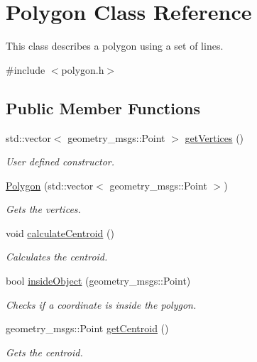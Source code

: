 \hypertarget{class_polygon}{}\section{Polygon Class Reference}
\label{class_polygon}


This class describes a polygon using a set of lines.  




{\ttfamily \#include $<$polygon.\+h$>$}

\subsection*{Public Member Functions}
\begin{DoxyCompactItemize}
\item 
std\+::vector$<$ geometry\+\_\+msgs\+::\+Point $>$ \hyperlink{class_polygon_ac64090fe1e43e46d7667ffc9021878cd}{get\+Vertices} ()
\begin{DoxyCompactList}\small\item\em User defined constructor. \end{DoxyCompactList}\item 
\hyperlink{class_polygon_a31cc06303d544f460bdc89f61b2d03c2}{Polygon} (std\+::vector$<$ geometry\+\_\+msgs\+::\+Point $>$)
\begin{DoxyCompactList}\small\item\em Gets the vertices. \end{DoxyCompactList}\item 
\mbox{\label{class_polygon_a3232e5ee78e5a4dd771217cab87b0fa4}} 
void \hyperlink{class_polygon_a3232e5ee78e5a4dd771217cab87b0fa4}{calculate\+Centroid} ()
\begin{DoxyCompactList}\small\item\em Calculates the centroid. \end{DoxyCompactList}\item 
bool \hyperlink{class_polygon_a44c9c10e84f1fa82da3f9353b8961462}{inside\+Object} (geometry\+\_\+msgs\+::\+Point)
\begin{DoxyCompactList}\small\item\em Checks if a coordinate is inside the polygon. \end{DoxyCompactList}\item 
geometry\+\_\+msgs\+::\+Point \hyperlink{class_polygon_a9816eb2e2f0fcd11b229d753205b5996}{get\+Centroid} ()
\begin{DoxyCompactList}\small\item\em Gets the centroid. \end{DoxyCompactList}\end{DoxyCompactItemize}


